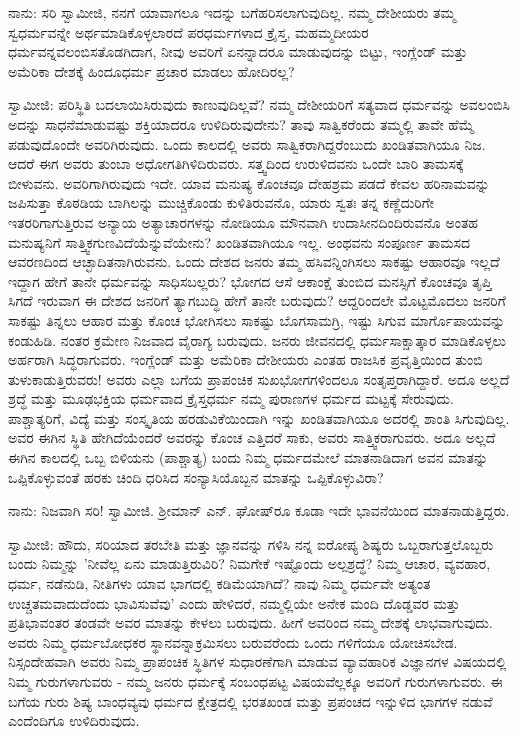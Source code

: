 ನಾನು: ಸರಿ ಸ್ವಾಮೀಜಿ, ನನಗೆ ಯಾವಾಗಲೂ ಇದನ್ನು ಬಗೆಹರಿಸಲಾಗುವುದಿಲ್ಲ. ನಮ್ಮ ದೇಶೀಯರು ತಮ್ಮ ಸ್ವಧರ್ಮವನ್ನೇ ಅರ್ಥಮಾಡಿಕೊಳ್ಳಲಾರದೆ ಪರಧರ್ಮಗಳಾದ ಕ್ರೈಸ್ತ, ಮಹಮ್ಮದೀಯರ ಧರ್ಮವನ್ನವಲಂಬಿಸತೊಡಗಿದಾಗ, ನೀವು ಅವರಿಗೆ ಏನನ್ನಾದರೂ ಮಾಡುವುದನ್ನು ಬಿಟ್ಟು, ಇಂಗ್ಲೆಂಡ್ ಮತ್ತು ಅಮೆರಿಕಾ ದೇಶಕ್ಕೆ ಹಿಂದೂಧರ್ಮ ಪ್ರಚಾರ ಮಾಡಲು ಹೋದಿರಲ್ಲ?

ಸ್ವಾಮೀಜಿ: ಪರಿಸ್ಥಿತಿ ಬದಲಾಯಿಸಿರುವುದು ಕಾಣುವುದಿಲ್ಲವೆ? ನಮ್ಮ ದೇಶೀಯರಿಗೆ ಸತ್ಯವಾದ ಧರ್ಮವನ್ನು ಅವಲಂಬಿಸಿ ಅದನ್ನು ಸಾಧನೆಮಾಡುವಷ್ಟು ಶಕ್ತಿಯಾದರೂ ಉಳಿದಿರುವುದೇನು? ತಾವು ಸಾತ್ವಿಕರೆಂದು ತಮ್ಮಲ್ಲಿ ತಾವೇ ಹೆಮ್ಮೆ ಪಡುವುದೊಂದೇ ಅವರಿಗಿರುವುದು. ಒಂದು ಕಾಲದಲ್ಲಿ ಅವರು ಸಾತ್ವಿಕರಾಗಿದ್ದರೆಂಬುದು ಖಂಡಿತವಾಗಿಯೂ ನಿಜ. ಆದರೆ ಈಗ ಅವರು ತುಂಬಾ ಅಧೋಗತಿಗಿಳಿದಿರುವರು. ಸತ್ತ್ವದಿಂದ ಉರುಳಿದವನು ಒಂದೇ ಬಾರಿ ತಾಮಸಕ್ಕೆ ಬೀಳುವನು. ಅವರಿಗಾಗಿರುವುದು ಇದೇ. ಯಾವ ಮನುಷ್ಯ ಕೊಂಚವೂ ದೇಹಶ್ರಮ ಪಡದೆ ಕೇವಲ ಹರಿನಾಮವನ್ನು ಜಪಿಸುತ್ತಾ ಕೊಠಡಿಯ ಬಾಗಿಲನ್ನು ಮುಚ್ಚಿಕೊಂಡು ಕುಳಿತಿರುವನೊ, ಯಾರು ಸ್ವತಃ ತನ್ನ ಕಣ್ಣೆದುರಿಗೇ ಇತರರಿಗಾಗುತ್ತಿರುವ ಅನ್ಯಾಯ ಅತ್ಯಾಚಾರಗಳನ್ನು ನೋಡಿಯೂ ಮೌನವಾಗಿ ಉದಾಸೀನದಿಂದಿರುವನೊ ಅಂತಹ ಮನುಷ್ಯನಿಗೆ ಸಾತ್ತ್ವಿಕಗುಣವಿದೆಯೆನ್ನುವೆಯೇನು? ಖಂಡಿತವಾಗಿಯೂ ಇಲ್ಲ. ಅಂಥವನು ಸಂಪೂರ್ಣ ತಾಮಸದ ಆವರಣದಿಂದ ಆಚ್ಛಾದಿತನಾಗಿರುವನು. ಒಂದು ದೇಶದ ಜನರು ತಮ್ಮ ಹಸಿವನ್ನಿಂಗಿಸಲು ಸಾಕಷ್ಟು ಆಹಾರವೂ ಇಲ್ಲದೆ ಇದ್ದಾಗ ಹೇಗೆ ತಾನೇ ಧರ್ಮವನ್ನು ಸಾಧಿಸಬಲ್ಲರು? ಭೋಗದ ಆಸೆ ಆಕಾಂಕ್ಷೆ ತುಂಬಿದ ಮನಸ್ಸಿಗೆ ಕೊಂಚವೂ ತೃಪ್ತಿ ಸಿಗದೆ ಇರುವಾಗ ಈ ದೇಶದ ಜನರಿಗೆ ತ್ಯಾಗಬುದ್ಧಿ ಹೇಗೆ ತಾನೇ ಬರುವುದು? ಆದ್ದರಿಂದಲೇ ಮೊಟ್ಟಮೊದಲು ಜನರಿಗೆ ಸಾಕಷ್ಟು ತಿನ್ನಲು ಆಹಾರ ಮತ್ತು ಕೊಂಚ ಭೋಗಿಸಲು ಸಾಕಷ್ಟು ಬೊಗಸಾಮಗ್ರಿ, ಇಷ್ಟು ಸಿಗುವ ಮಾರ್ಗೊಪಾಯವನ್ನು ಕಂಡುಹಿಡಿ. ನಂತರ ಕ್ರಮೇಣ ನಿಜವಾದ ವೈರಾಗ್ಯ ಬರುವುದು. ಜನರು ಜೀವನದಲ್ಲಿ ಧರ್ಮಸಾಕ್ಷಾತ್ಕಾರ ಮಾಡಿಕೊಳ್ಳಲು ಅರ್ಹರಾಗಿ ಸಿದ್ಧರಾಗುವರು. ಇಂಗ್ಲೆಂಡ್ ಮತ್ತು ಅಮೆರಿಕಾ ದೇಶೀಯರು ಎಂತಹ ರಾಜಸಿಕ ಪ್ರವೃತ್ತಿಯಿಂದ ತುಂಬಿ ತುಳುಕಾಡುತ್ತಿರುವರು! ಅವರು ಎಲ್ಲಾ ಬಗೆಯ ಪ್ರಾಪಂಚಿಕ ಸುಖಭೋಗಗಳಿಂದಲೂ ಸಂತೃಪ್ತರಾಗಿದ್ದಾರೆ. ಅದೂ ಅಲ್ಲದೆ ಶ್ರದ್ಧೆ ಮತ್ತು ಮೂಢಭಕ್ತಿಯ ಧರ್ಮವಾದ ಕ್ರೈಸ್ತಧರ್ಮ ನಮ್ಮ ಪುರಾಣಗಳ ಧರ್ಮದ ಮಟ್ಟಕ್ಕೆ ಸೇರುವುದು. ಪಾಶ್ಚಾತ್ಯರಿಗೆ, ವಿದ್ಯೆ ಮತ್ತು ಸಂಸ್ಕೃತಿಯ ಹರಡುವಿಕೆಯಿಂದಾಗಿ ಇನ್ನು ಖಂಡಿತವಾಗಿಯೂ ಅದರಲ್ಲಿ ಶಾಂತಿ ಸಿಗುವುದಿಲ್ಲ. ಅವರ ಈಗಿನ ಸ್ಥಿತಿ ಹೇಗಿದೆಯೆಂದರೆ ಅವರನ್ನು ಕೊಂಚ ಎತ್ತಿದರೆ ಸಾಕು, ಅವರು ಸಾತ್ತ್ವಿಕರಾಗುವರು. ಅದೂ ಅಲ್ಲದೆ ಈಗಿನ ಕಾಲದಲ್ಲಿ ಒಬ್ಬ ಬಿಳಿಯನು (ಪಾಶ್ಚಾತ್ಯ) ಬಂದು ನಿಮ್ಮ ಧರ್ಮದಮೇಲೆ ಮಾತನಾಡಿದಾಗ ಅವನ ಮಾತನ್ನು ಒಪ್ಪಿಕೊಳ್ಳುವಂತೆ ಹರಕು ಚಿಂದಿ ಧರಿಸಿದ ಸಂನ್ಯಾಸಿಯೊಬ್ಬನ ಮಾತನ್ನು ಒಪ್ಪಿಕೊಳ್ಳುವಿರಾ?

ನಾನು: ನಿಜವಾಗಿ ಸರಿ! ಸ್ವಾಮೀಜಿ. ಶ‍್ರೀಮಾನ್ ಎನ್. ಘೋಷ್‌ರೂ ಕೂಡಾ ಇದೇ ಭಾವನೆಯಿಂದ ಮಾತನಾಡುತ್ತಿದ್ದರು.

ಸ್ವಾಮೀಜಿ: ಹೌದು, ಸರಿಯಾದ ತರಬೇತಿ ಮತ್ತು ಜ್ಞಾನವನ್ನು ಗಳಿಸಿ ನನ್ನ ಐರೋಪ್ಯ ಶಿಷ್ಯರು ಒಬ್ಬರಾಗುತ್ತಲೊಬ್ಬರು ಬಂದು ನಿಮ್ಮನ್ನು 'ನೀವೆಲ್ಲ ಏನು ಮಾಡುತ್ತಿರುವಿರಿ? ನಿಮಗೇಕೆ ಇಷ್ಟೊಂದು ಅಲ್ಪಶ್ರದ್ಧೆ? ನಿಮ್ಮ ಆಚಾರ, ವ್ಯವಹಾರ, ಧರ್ಮ, ನಡೆನುಡಿ, ನೀತಿಗಳು ಯಾವ ಭಾಗದಲ್ಲಿ ಕಡಿಮೆಯಾಗಿದೆ? ನಾವು ನಿಮ್ಮ ಧರ್ಮವೇ ಅತ್ಯಂತ ಉಚ್ಚತಮವಾದುದೆಂದು ಭಾವಿಸುವೆವು' ಎಂದು ಹೇಳಿದರೆ, ನಮ್ಮಲ್ಲಿಯೇ ಅನೇಕ ಮಂದಿ ದೊಡ್ಡವರ ಮತ್ತು ಪ್ರತಿಭಾವಂತರ ತಂಡವೇ ಅವರ ಮಾತನ್ನು ಕೇಳಲು ಬರುವುದು. ಹೀಗೆ ಅವರಿಂದ ನಮ್ಮ ದೇಶಕ್ಕೆ ಲಾಭವಾಗುವುದು. ಅವರು ನಿಮ್ಮ ಧರ್ಮಬೋಧಕರ ಸ್ಥಾನವನ್ನಾಕ್ರಮಿಸಲು ಬರುವರೆಂದು ಒಂದು ಗಳಿಗೆಯೂ ಯೋಚಿಸಬೇಡ. ನಿಸ್ಸಂದೇಹವಾಗಿ ಅವರು ನಿಮ್ಮ ಪ್ರಾಪಂಚಿಕ ಸ್ಥಿತಿಗಳ ಸುಧಾರಣೆಗಾಗಿ ಮಾಡುವ ವ್ಯಾವಹಾರಿಕ ವಿಜ್ಞಾನಗಳ ವಿಷಯದಲ್ಲಿ ನಿಮ್ಮ ಗುರುಗಳಾಗುವರು - ನಮ್ಮ ಜನರು ಧರ್ಮಕ್ಕೆ ಸಂಬಂಧಪಟ್ಟ ವಿಷಯವೆಲ್ಲಕ್ಕೂ ಅವರಿಗೆ ಗುರುಗಳಾಗುವರು. ಈ ಬಗೆಯ ಗುರು ಶಿಷ್ಯ ಬಾಂಧವ್ಯವು ಧರ್ಮದ ಕ್ಷೇತ್ರದಲ್ಲಿ ಭರತಖಂಡ ಮತ್ತು ಪ್ರಪಂಚದ ಇನ್ನುಳಿದ ಭಾಗಗಳ ನಡುವೆ ಎಂದೆಂದಿಗೂ ಉಳಿದಿರುವುದು.


